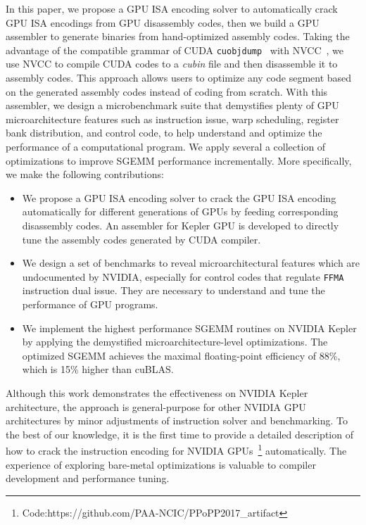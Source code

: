In this paper, we propose a GPU ISA encoding solver to automatically crack GPU ISA encodings from GPU disassembly codes,
then we build a GPU assembler to generate binaries from hand-optimized assembly codes.%
Taking the advantage of the compatible grammar of CUDA {\tt cuobjdump}~\cite{cubin2015util} with NVCC~\cite{nvcc}, we use NVCC to compile CUDA codes to a {\em cubin} file and 
then disassemble it to assembly codes. 
This approach allows users to optimize any code segment based on the generated assembly codes instead of coding from scratch. 
With this assembler, we design a microbenchmark suite that 
demystifies plenty of GPU microarchitecture features such as instruction issue, warp scheduling, register bank distribution, and control code, to help understand and optimize the performance of a computational program. 
We apply several a collection of 
optimizations to improve SGEMM performance incrementally. More specifically, we make the following contributions:
\begin{itemize}
\item We propose a GPU ISA encoding solver to crack the GPU ISA encoding
    automatically for different generations of GPUs by feeding corresponding disassembly codes.
An assembler for Kepler GPU is developed to directly tune the assembly codes generated by CUDA compiler.
\item We design a set of benchmarks to reveal microarchitectural features which are undocumented by NVIDIA, 
especially for control codes that regulate {\tt FFMA} instruction dual issue.
They are necessary to understand and tune the performance of GPU programs.
\item We implement the highest performance SGEMM routines on NVIDIA Kepler by applying the demystified 
microarchitecture-level optimizations. The optimized SGEMM achieves the maximal floating-point efficiency of 88\%, 
which is 15\% higher than cuBLAS.
\end{itemize}

Although this work demonstrates the effectiveness on NVIDIA Kepler architecture, the approach is general-purpose for 
other NVIDIA GPU architectures by minor adjustments of instruction solver and benchmarking. 
To the best of our 
knowledge, it is the first time to provide a detailed description of how to crack the instruction encoding for NVIDIA 
GPUs~\footnote{Code:https://github.com/PAA-NCIC/PPoPP2017\_artifact} automatically. 
The experience of 
exploring bare-metal optimizations is valuable to compiler development and performance tuning.

